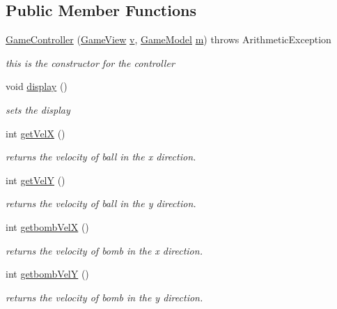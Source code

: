 \subsection*{Public Member Functions}
\begin{DoxyCompactItemize}
\item 
\hyperlink{classstart_game_1_1_game_controller_aecc647e49ed23b571160d7d7c68b04d7}{Game\+Controller} (\hyperlink{classview_1_1_game_view}{Game\+View} \hyperlink{classstart_game_1_1_game_controller_a86e3c6ba6e8d0ecb0946da48fa55e7ee}{v}, \hyperlink{classmodel_1_1_game_model}{Game\+Model} \hyperlink{classstart_game_1_1_game_controller_a2c79234f85f979b8f1efe5a48893560d}{m})  throws Arithmetic\+Exception
\begin{DoxyCompactList}\small\item\em this is the constructor for the controller \end{DoxyCompactList}\item 
void \hyperlink{classstart_game_1_1_game_controller_abe07c8d60c3adbb0993e637b8c725884}{display} ()
\begin{DoxyCompactList}\small\item\em sets the display \end{DoxyCompactList}\item 
int \hyperlink{classstart_game_1_1_game_controller_a2170345005b5f2f453951dd7b4691e0f}{get\+VelX} ()
\begin{DoxyCompactList}\small\item\em returns the velocity of ball in the x direction. \end{DoxyCompactList}\item 
int \hyperlink{classstart_game_1_1_game_controller_a03bc4dfd9bc501924f18e7f9f49361db}{get\+VelY} ()
\begin{DoxyCompactList}\small\item\em returns the velocity of ball in the y direction. \end{DoxyCompactList}\item 
int \hyperlink{classstart_game_1_1_game_controller_a1b902c1d6b489b6499c340b1db67e868}{getbomb\+VelX} ()
\begin{DoxyCompactList}\small\item\em returns the velocity of bomb in the x direction. \end{DoxyCompactList}\item 
int \hyperlink{classstart_game_1_1_game_controller_a8996d95affa45808c489767da11b6622}{getbomb\+VelY} ()
\begin{DoxyCompactList}\small\item\em returns the velocity of bomb in the y direction. \end{DoxyCompactList}\end{DoxyCompactItemize}
